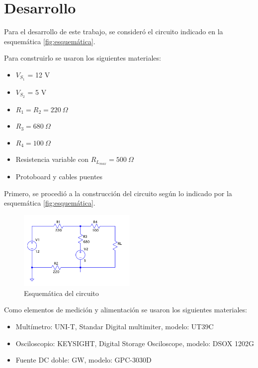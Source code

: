\documentclass{article}
\begin{document}
    \indent
    \section{Desarrollo}
        \quad Para el desarrollo de este trabajo, se consideró el circuito indicado en la esquemática \autoref{fig:esquemática}.\par
        Para construirlo se usaron los siguientes materiales:\par
        
            	\begin{itemize}
                \item $V_{S_{1}}$ = 12 V
                \item $V_{S_{2}}$ = 5 V
                \item $R_{1} = R_{2} = 220 ~\Omega $
                \item $R_{3} = 680~ \Omega $
                \item $R_{4} = 100~ \Omega $
                \item Resistencia variable con $R_{L_{max}} = 500~\Omega$
                \item Protoboard y cables puentes
                \end{itemize}
        
        
        Primero, se procedió a la construcción del circuito según lo indicado por la esquemática \autoref{fig:esquemática}.\par %

\begin{figure}[!h]
  \centering
  \includegraphics[width=0.5\textwidth]{circuitoLTSpice.png}
  \caption{Esquemática del circuito}
  \label{fig:esquemática}
\end{figure}
        
       Como elementos de medición y alimentación se usaron los siguientes materiales:\par
       
                   \begin{itemize}
                \item Multímetro: UNI-T,  Standar Digital multimiter, modelo: UT39C
                \item Osciloscopio: KEYSIGHT, Digital Storage Osciloscope, modelo: DSOX 1202G 
                \item Fuente DC doble: GW, modelo: GPC-3030D
                \end{itemize}
\end{document}
